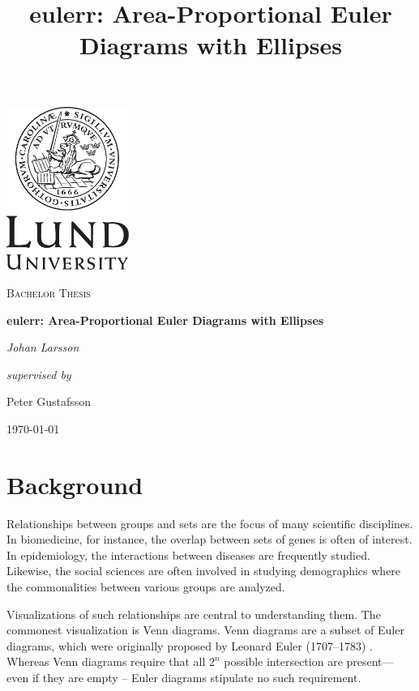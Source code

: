 \documentclass[a4paper,nofonts,nobib,titlepage,justified,marginals=raggedouter,nohyper]{tufte-handout}\usepackage[]{graphicx}\usepackage[]{color}
\title{eulerr: Area-Proportional Euler Diagrams with Ellipses}
\begin{document}
\begin{titlepage}
\begin{fullwidth}
\centering
\vspace*{3cm}
\includegraphics[width=0.3\textwidth]{LundUniversity_C2line_BLACK}\par\vspace{1cm}
\vspace{0.5cm}
{\scshape\Large Bachelor Thesis \par}
{\Huge\bfseries eulerr: Area-Proportional Euler Diagrams with Ellipses\par}
\vspace{2cm}
{\huge\itshape Johan Larsson\par}
\vspace{2cm}
\Large{\itshape supervised by}\par
 Peter Gustafsson

\vfill

{\large \today\par}
 \end{fullwidth}%
\end{titlepage}

\section{Background}
Relationships between groups and sets are the focus of many scientific
disciplines. In biomedicine, for instance, the overlap between sets of genes
is often of interest. In epidemiology, the interactions between
diseases are frequently studied. Likewise, the social sciences are often
involved in studying demographics where the commonalities between various
groups are analyzed.

Visualizations of such relationships are central to understanding them.
The commonest visualization is Venn diagrams. Venn diagrams are a
subset of Euler diagrams, which were originally proposed by Leonard Euler
(1707--1783) \citep{euler_1802}. Whereas Venn diagrams require that all
$2^n$ possible intersection are present---even if they are empty -- Euler
diagrams stipulate no such requirement.
\end{document}
